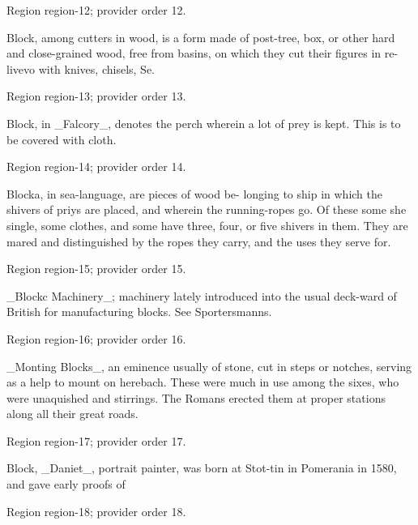 \documentclass[11pt]{article}
\begin{document}
{\scriptsize\color{gray} Region region-12; provider order 12.\par}
\medskip

Block, among cutters in wood, is a form made of post-tree, box, or other hard and close-grained wood, free from basins, on which they cut their figures in re- livevo with knives, chisels, Se.
\par

{\scriptsize\color{gray} Region region-13; provider order 13.\par}
\medskip

Block, in \_Falcory\_, denotes the perch wherein a lot of prey is kept. This is to be covered with cloth.
\par

{\scriptsize\color{gray} Region region-14; provider order 14.\par}
\medskip

Blocka, in sea-language, are pieces of wood be- longing to ship in which the shivers of priys are placed, and wherein the running-ropes go. Of these some she single, some clothes, and some have three, four, or five shivers in them. They are mared and distinguished by the ropes they carry, and the uses they serve for.
\par

{\scriptsize\color{gray} Region region-15; provider order 15.\par}
\medskip

\_Blockc Machinery\_; machinery lately introduced into the usual deck-ward of British for manufacturing blocks. See Sportersmanns.
\par

{\scriptsize\color{gray} Region region-16; provider order 16.\par}
\medskip

\_Monting Blocks\_, an eminence usually of stone, cut in steps or notches, serving as a help to mount on herebach. These were much in use among the sixes, who were unaquished and stirrings. The Romans erected them at proper stations along all their great roads.
\par

{\scriptsize\color{gray} Region region-17; provider order 17.\par}
\medskip

Block, \_Daniet\_, portrait painter, was born at Stot-tin in Pomerania in 1580, and gave early proofs of
\par

{\scriptsize\color{gray} Region region-18; provider order 18.\par}
\medskip
\end{document}
